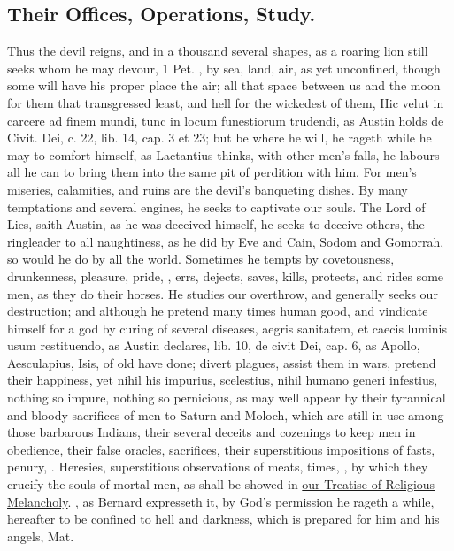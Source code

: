 {{\subsection{Their Offices, Operations, Study.}
Thus the devil reigns, and in a thousand several shapes, as a roaring lion still seeks whom he may
devour, 1 Pet. , by sea, land, air, as yet unconfined, though 
some will have his proper place the air; all that space between us and
the moon for them that transgressed least, and hell for the wickedest
of them, Hic velut in carcere ad finem mundi, tunc in locum funestiorum
trudendi, as Austin holds de Civit. Dei, c. 22, lib. 14, cap. 3 et 23;
but be where he will, he rageth while he may to comfort himself, as
 Lactantius thinks, with other men's falls, he labours all he can
to bring them into the same pit of perdition with him. For men's
miseries, calamities, and ruins are the devil's banqueting dishes. By
many temptations and several engines, he seeks to captivate our souls.
The Lord of Lies, saith Austin, as he was deceived himself, he
seeks to deceive others, the ringleader to all naughtiness, as he did
by Eve and Cain, Sodom and Gomorrah, so would he do by all the world.
Sometimes he tempts by covetousness, drunkenness, pleasure, pride, \etc{},
errs, dejects, saves, kills, protects, and rides some men, as they do
their horses. He studies our overthrow, and generally seeks our
destruction; and although he pretend many times human good, and
vindicate himself for a god by curing of several diseases, aegris
sanitatem, et caecis luminis usum restituendo, as Austin declares, lib.
10, de civit Dei, cap. 6, as Apollo, Aesculapius, Isis, of old have
done; divert plagues, assist them in wars, pretend their happiness, yet
nihil his impurius, scelestius, nihil humano generi infestius, nothing
so impure, nothing so pernicious, as may well appear by their
tyrannical and bloody sacrifices of men to Saturn and Moloch, which are
still in use among those barbarous Indians, their several deceits and
cozenings to keep men in obedience, their false oracles, sacrifices,
their superstitious impositions of fasts, penury, \etc{}. Heresies,
superstitious observations of meats, times, \etc{}, by which they 
crucify the souls of mortal men, as shall be showed in \hyperref[ch:religious-melancholy]{our Treatise of
Religious Melancholy}. , as Bernard expresseth it, by God's permission he rageth a while, hereafter
to be confined to hell and darkness, which is prepared for him and his
angels, Mat. 

}}
